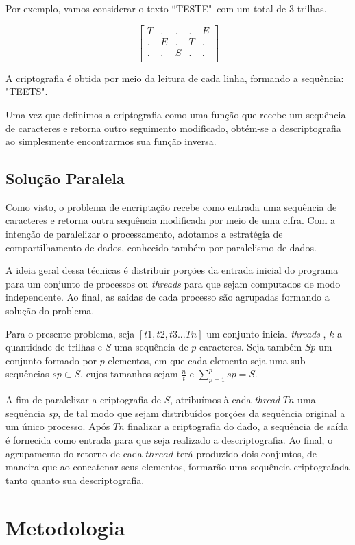 \documentclass[letterpaper, 10 pt, conference]{ieeeconf}  %
\begin{document}
Por exemplo, vamos considerar o texto  ``TESTE"\ com um total de 3 trilhas.

\[
  \begin{bmatrix}
    T & . & . & . & E \\
    . & E & . & T & . \\
    . & . & S & . & . \\
  \end{bmatrix}
\]

A criptografia é obtida por meio da leitura de cada linha, formando a sequência: "TEETS". 

Uma vez que definimos a criptografia como uma função que recebe um sequência de caracteres e retorna outro seguimento modificado, obtém-se a descriptografia ao simplesmente encontrarmos sua função inversa.

\subsection{Solução Paralela}
Como visto, o problema de encriptação recebe como entrada uma sequência de caracteres e retorna outra sequência modificada por meio de uma cifra. Com a intenção de paralelizar o processamento, adotamos a estratégia de compartilhamento de dados, conhecido também por paralelismo de dados.

A ideia geral dessa técnicas é distribuir porções da entrada inicial do programa para um conjunto de processos ou \textit{threads} para que sejam computados de modo independente. Ao final, as saídas de cada processo são agrupadas formando a solução do problema.

Para o presente problema, seja $[t1,t2,t3...Tn]$ um conjunto inicial \textit{threads} , $k$ a quantidade de trilhas e $S$ uma sequência de $p$ caracteres. Seja também $Sp$ um conjunto formado por $p$ elementos, em que cada elemento seja uma sub-sequências $sp \subset S$, cujos tamanhos sejam $\frac{n}{t}$ e $\sum_{p=1}^{p} sp = S$. 

A fim de paralelizar a criptografia de $S$, atribuímos à cada \textit{thread} $Tn$ uma sequência $sp$, de tal modo que sejam distribuídos porções da sequência original a um único processo. Após $Tn$ finalizar a criptografia do dado, a sequência de saída é fornecida como entrada para que seja realizado a descriptografia. Ao final, o agrupamento do retorno de cada $thread$ terá produzido dois conjuntos, de maneira que ao concatenar seus elementos, formarão uma sequência criptografada tanto quanto sua descriptografia.
\section{Metodologia}
\end{document}
